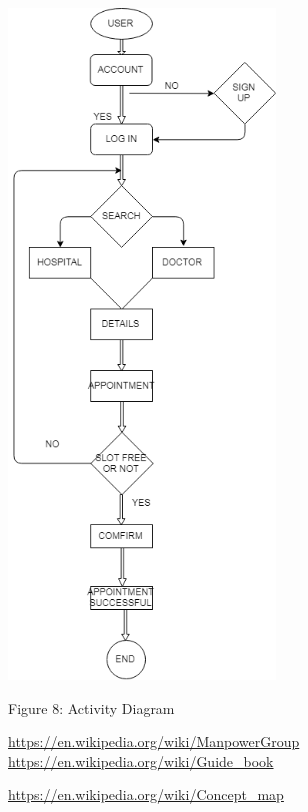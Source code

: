 \documentclass[12pt]{article}
\begin{document}
\includegraphics[height=7in]{ActivityDiagram.png}
\begin{center}
 \caption{ Figure 8: Activity Diagram}
    
\end{center}



\begin{thebibliography}{99}
 

 \url{https://en.wikipedia.org/wiki/ManpowerGroup}
 \url{https://en.wikipedia.org/wiki/Guide_book}

 \url{https://en.wikipedia.org/wiki/Concept_map}

\end{thebibliography}
\end{document}

